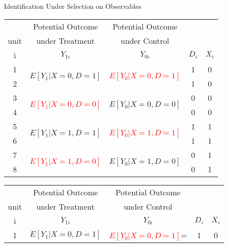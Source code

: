 \documentclass{beamer}
\numberwithin{equation}{section}
\begin{document}
\begin{frame}{Identification Under Selection on Observables}

\begin{overprint}
\begin{small}
\begin{tabular}{c|c|c|c|c}
 &Potential Outcome & Potential Outcome &   & \\
unit &under Treatment  & under Control &   &  \\
\hline
   i  & $Y_{1i}$  & $Y_{0i}$ &    $D_i$ &  $X_i$ \\
\hline
         1 & \multirow{2}{*}{$E[Y_1|X=0,D=1]$ } & \multirow{2}{*}{\textcolor{red}{$E[Y_0|X=0,D=1]$} } &                    1 &          0 \\
         2 & \multicolumn{ 1}{c|}{} & \multicolumn{ 1}{c|}{} &                    1 &          0 \\
\hline
         3 & \multirow{2}{*}{\textcolor{red}{$E[Y_1|X=0,D=0]$}} & \multirow{2}{*}{$E[Y_0|X=0,D=0]$ } &                   0 &          0 \\
         4 & \multicolumn{ 1}{c|}{} & \multicolumn{ 1}{c|}{} &                    0 &          0 \\
\hline
         5 & \multirow{2}{*}{$E[Y_1|X=1,D=1]$ } & \multirow{2}{*}{\textcolor{red}{$E[Y_0|X=1,D=1]$}} &                    1 &          1 \\
         6 & \multicolumn{ 1}{c|}{} & \multicolumn{ 1}{c|}{} &                    1 &          1 \\
\hline
         7 & \multirow{2}{*}{\textcolor{red}{$E[Y_1|X=1,D=0]$}} & \multirow{2}{*}{$E[Y_0|X=1,D=0]$} &                    0 &          1 \\
         8 & \multicolumn{ 1}{c|}{} & \multicolumn{ 1}{c|}{} &                   0 &          1 \\
\hline
\end{tabular}
\end{small}
\begin{small}
\begin{tabular}{c|c|c|c|c}
 &Potential Outcome & Potential Outcome &   & \\
unit &under Treatment  & under Control &   &  \\
\hline
   i  & $Y_{1i}$  & $Y_{0i}$ &    $D_i$ &  $X_i$ \\
\hline
         1 & \multirow{2}{*}{$E[Y_1|X=0,D=1]$ } & \multicolumn{ 1}{c|}{\textcolor{red}{$E[Y_0|X=0,D=1]$}= } &                    1 &          0 \\

\end{tabular}
\end{small}
\end{overprint}
\end{frame}
\end{document}
